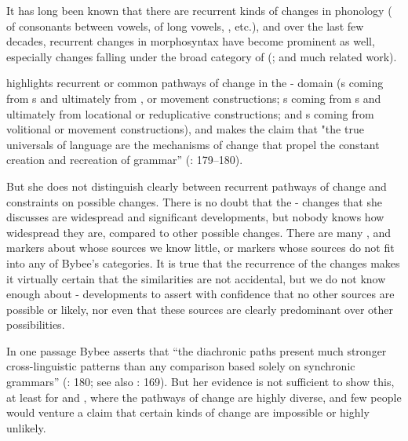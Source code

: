 \documentclass[output=paper]{langsci/langscibook}
\begin{document}
It has long been known that there are recurrent kinds of changes in phonology ( of consonants between vowels,  of long vowels, , etc.), and over the last few decades, recurrent changes in morphosyntax have become prominent as well, especially changes falling under the broad category of  (\citealt{Lehmann1982,HeineEtAl1991,BybeeEtAl1994}; and much related work).

\citet{Bybee2006} highlights recurrent or common pathways of change in the - domain (s coming from s and ultimately from ,  or movement constructions; s coming from s and ultimately from locational or reduplicative constructions; and s coming from volitional or movement constructions), and makes the claim that "the true universals of language are the mechanisms of change that propel the constant creation and recreation of grammar” (\citealt{Bybee2006}: 179–180).

 
But she does not distinguish clearly between recurrent pathways of change and constraints on possible changes. There is no doubt that the - changes that she discusses are widespread and significant developments, but nobody knows how widespread they are, compared to other possible changes. There are many ,  and  markers about whose sources we know little, or markers whose sources do not fit into any of Bybee’s categories. It is true that the recurrence of the changes makes it virtually certain that the similarities are not accidental, but we do not know enough about - developments to assert with confidence that no other sources are possible or likely, nor even that these sources are clearly predominant over other possibilities. 
 
In one passage Bybee asserts that “the diachronic paths present much stronger cross-linguistic patterns than any comparison based solely on synchronic grammars” (\citeyear{Bybee2006}: 180; see also \citealt{Bybee2008}: 169). But her evidence is not sufficient to show this, at least for  and , where the pathways of change are highly diverse, and few people would venture a claim that certain kinds of change are impossible or highly unlikely. 
 
\end{document}
